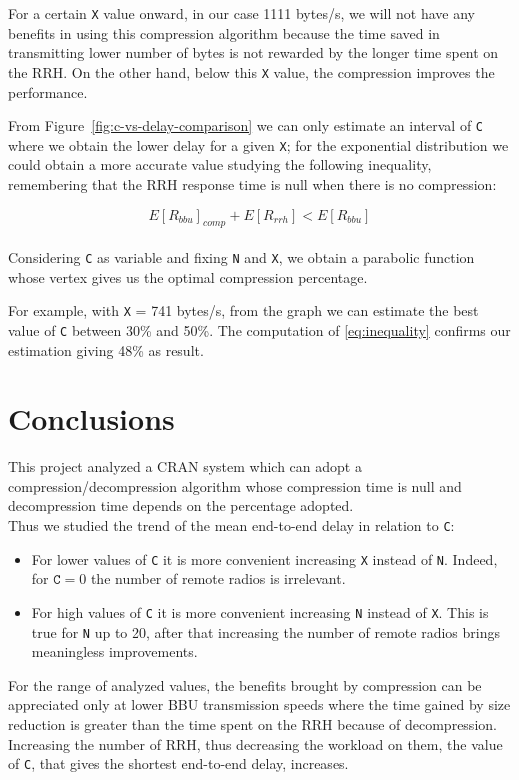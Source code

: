 \documentclass[11pt,a4paper,oneside, openright]{article}
\begin{document}
For a certain \texttt{X} value onward, in our case 1111 bytes/s, we will not have any benefits in using this compression algorithm because the time saved in transmitting lower number of bytes is not rewarded by the longer time spent on the RRH.
On the other hand, below this \texttt{X} value, the compression improves the performance. 

From Figure~\ref{fig:c-vs-delay-comparison} we can only estimate an interval of \texttt{C} where we obtain the lower delay for a given \texttt{X}; for the exponential distribution we could obtain a more accurate value studying the following inequality, remembering that the RRH response time is null when there is no compression:

\begin{equation} \label{eq:inequality}
E[R_{bbu}]_{comp} + E[R_{rrh}] < E[R_{bbu}]
\end{equation}
\\
Considering \texttt{C} as variable and fixing \texttt{N} and \texttt{X}, we obtain a parabolic function whose vertex gives us the optimal compression percentage.

For example, with \texttt{X} = 741 bytes/s, from the graph we can estimate the best value of \texttt{C} between 30\% and 50\%. The computation of \ref{eq:inequality} confirms our estimation giving 48\% as result.

\newpage
\section{Conclusions}
This project analyzed a CRAN system which can adopt a compression/decompression algorithm whose compression time is null and decompression time depends on the percentage adopted.\\
Thus we studied the trend of the mean end-to-end delay in relation to \texttt{C}: 
\begin{itemize}
	\item For lower values of \texttt{C} it is more convenient increasing \texttt{X} instead of \texttt{N}. Indeed, for $\texttt{C} = 0 $ the number of remote radios is irrelevant.
	\item For high values of \texttt{C} it is more convenient increasing \texttt{N} instead of \texttt{X}. This is true for \texttt{N} up to 20, after that increasing the number of remote radios brings meaningless improvements.
\end{itemize}
For the range of analyzed values, the benefits brought by compression can be appreciated only at lower BBU transmission speeds where the time gained by size reduction is greater than the time spent on the RRH because of decompression. Increasing the number of RRH, thus decreasing the workload on them, the value of \texttt{C}, that gives the shortest end-to-end delay, increases.
\end{document}

